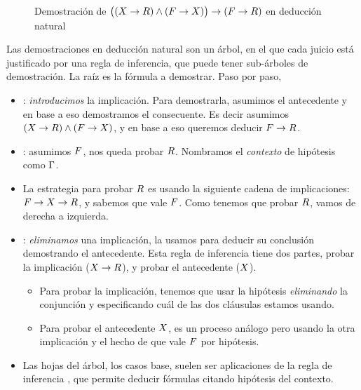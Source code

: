 \begin{ejemplo}
\begin{figure}[H]
        \caption{Demostración de \(
        \big(
            (X \to R) \wedge (F \to X)
        \big)
        \to
        (F \to R)
    \) en deducción natural}
        \label{nd:fig:proof-exam-nd}
    \end{figure}

    Las demostraciones en deducción natural son un árbol, en el que cada juicio está justificado por una regla de inferencia, que puede tener sub-árboles de demostración. La raíz es la fórmula a demostrar. Paso por paso,

    \begin{itemize}
        \item {}: \textit{introducimos} la implicación. Para demostrarla,
        asumimos el antecedente y en base a eso demostramos el consecuente. Es
        decir asumimos $(X \to R) \wedge (F \to
        X)$, y en base a eso queremos deducir $F \to R$.
        \item {}: asumimos $F$, nos queda probar $R$.
        Nombramos el \textit{contexto} de hipótesis como $\Gamma$.
        \item La estrategia para probar $R$ es usando la siguiente cadena
        de implicaciones: $F \to X \to R$, y sabemos que
        vale $F$. Como tenemos que probar $R$, vamos de derecha a izquierda.
        \item {}: \textit{eliminamos} una implicación, la usamos para
        deducir su conclusión demostrando el antecedente. Esta regla de
        inferencia tiene dos partes, probar la implicación ($X \to
        R$), y probar el antecedente ($X$).
        \begin{itemize}
            \item Para probar la implicación, tenemos que usar la hipótesis \textit{eliminando} la conjunción y especificando cuál
            de las dos cláusulas estamos usando.
            \item Para probar el antecedente $X$, es un proceso análogo
            pero usando la otra implicación y el hecho de que vale $F$ por hipótesis.
        \end{itemize}
        \item Las hojas del árbol, los casos base, suelen ser aplicaciones de
        la regla de inferencia , que permite deducir fórmulas citando
        hipótesis del contexto.
    \end{itemize}
\end{ejemplo}

